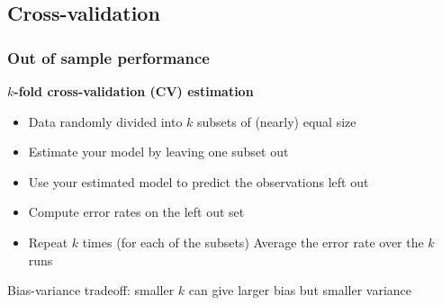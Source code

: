 \documentclass[a4paper]{article}\usepackage[]{graphicx}\usepackage[]{xcolor}
\begin{document}
\subsection{Cross-validation}
\subsubsection{Out of sample performance}
\textbf{\( k \)-fold cross-validation (CV) estimation}
\begin{itemize}
	\item Data randomly divided into \( k \) subsets of (nearly) equal size
	\item Estimate your model by leaving one subset out
	\item Use your estimated model to predict the observations left out
	\item Compute error rates on the left out set
	\item Repeat \( k \) times (for each of the subsets) Average the error rate over the \( k \) runs
\end{itemize}
Bias-variance tradeoff: smaller \( k \) can give larger bias but smaller variance
\end{document}
